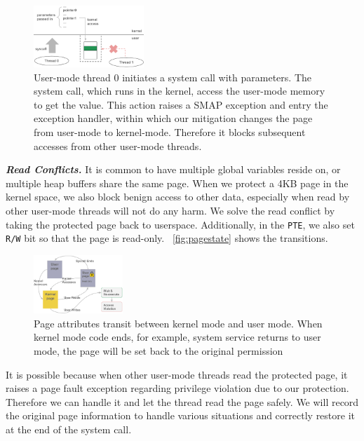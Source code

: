 \begin{figure}[th]
  \includegraphics[width=0.37\textwidth]{figures/denyuserwrite}
  \centering
  \caption{User-mode thread 0 initiates a system call with parameters. The system call, which runs in the kernel, access the user-mode memory to get the value. This action raises a SMAP exception and entry the exception handler, within which our mitigation changes the page from user-mode to kernel-mode. Therefore it blocks subsequent accesses from other user-mode threads.}
  \label{fig:denyuserwrite}
\end{figure}


\textbf{\textit{Read Conflicts.}} It is common to have multiple global variables reside on, or multiple heap buffers share the same page. When we protect a 4KB page in the kernel space, we also block benign access to other data, especially when read by other user-mode threads will not do any harm. We solve the read conflict by taking the protected page back to userspace. Additionally, in the \texttt{PTE}, we also set \texttt{R/W} bit so that the page is read-only. ~\autoref{fig:pagestate} shows the transitions.


\begin{figure}[th]
  \includegraphics[width=0.30\textwidth]{figures/pagestate}
  \centering
  \caption{Page attributes transit between kernel mode and user mode. When kernel mode code ends, for example, system service returns to user mode, the page will be set back to the original permission}
  \label{fig:pagestate}
\end{figure}


It is possible because when other user-mode threads read the protected page, it raises a page fault exception regarding privilege violation due to our protection. Therefore we can handle it and let the thread read the page safely. We will record the original page information to handle various situations and correctly restore it at the end of the system call. 



